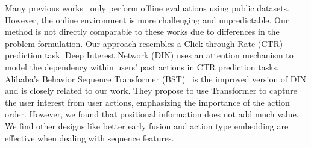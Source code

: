 Many previous works~\cite{SASRec,li2020time,sun2019bert4rec}
only perform offline evaluations using public datasets. However, the online environment is more challenging and unpredictable. Our method is not directly comparable to these works due to differences in the problem formulation. Our approach resembles a Click-through Rate (CTR) prediction task.
Deep Interest Network (DIN) uses an attention mechanism to model the dependency within users' past actions in CTR prediction tasks. 
Alibaba's Behavior Sequence Transformer (BST)~\cite{alibaba_seq_tfmr} is the improved version of DIN and is closely related to our work.
They propose to use Transformer to capture the user interest from user actions, emphasizing the importance of the action order.
However, we found that positional information does not add much value. We find other designs like better early fusion and action type embedding are effective when dealing with sequence features.







